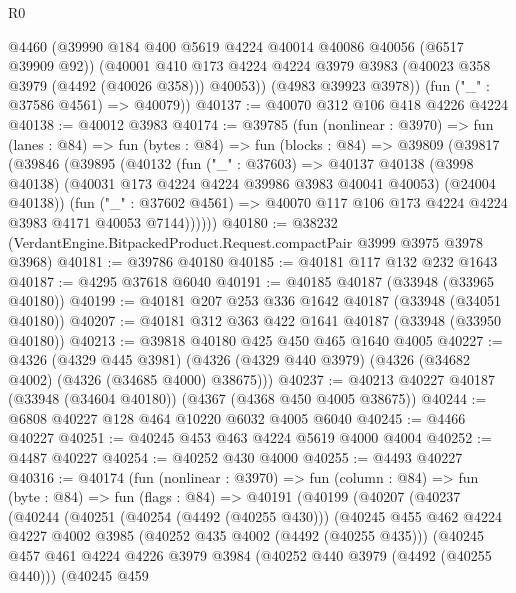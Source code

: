 \begin{lexlean}{R0}
\begin{coremodule}
          @4460
          (@39990 @184 @400 @5619 @4224 @40014 @40086 @40056 (@6517 @39909 @92))
          (@40001
            @410
            @173
            @4224
            @4224
            @3979
            @3983
            (@40023 @358 @3979 (@4492 (@40026 @358)))
            @40053))
        (@4983 @39923 @3978))
      (fun ("_" : @37586 @4561) => @40079))
@40137 := @40070 @312 @106 @418 @4226 @4224
@40138 := @40012 @3983
@40174 := @39785
    (fun (nonlinear : @3970) =>
    fun (lanes : @84) =>
    fun (bytes : @84) =>
    fun (blocks : @84) =>
    @39809
      (@39817
        (@39846
          (@39895
            (@40132
              (fun ("_" : @37603) =>
              @40137
                @40138
                (@3998 @40138)
                (@40031 @173 @4224 @4224 @39986 @3983 @40041 @40053)
                (@24004 @40138))
              (fun ("_" : @37602 @4561) =>
              @40070 @117 @106 @173 @4224 @4224 @3983 @4171 @40053 @7144))))))
@40180 := @38232 (VerdantEngine.BitpackedProduct.Request.compactPair @3999 @3975 @3978 @3968)
@40181 := @39786 @40180
@40185 := @40181 @117 @132 @232 @1643
@40187 := @4295 @37618 @6040
@40191 := @40185 @40187 (@33948 (@33965 @40180))
@40199 := @40181 @207 @253 @336 @1642 @40187 (@33948 (@34051 @40180))
@40207 := @40181 @312 @363 @422 @1641 @40187 (@33948 (@33950 @40180))
@40213 := @39818 @40180 @425 @450 @465 @1640 @4005
@40227 := @4326
    (@4329 @445 @3981)
    (@4326 (@4329 @440 @3979) (@4326 (@34682 @4002) (@4326 (@34685 @4000) @38675)))
@40237 := @40213 @40227 @40187 (@33948 (@34604 @40180)) (@4367 (@4368 @450 @4005 @38675))
@40244 := @6808 @40227 @128 @464 @10220 @6032 @4005 @6040
@40245 := @4466 @40227
@40251 := @40245 @453 @463 @4224 @5619 @4000 @4004
@40252 := @4487 @40227
@40254 := @40252 @430 @4000
@40255 := @4493 @40227
@40316 := @40174
    (fun (nonlinear : @3970) =>
    fun (column : @84) =>
    fun (byte : @84) =>
    fun (flags : @84) =>
    @40191
      (@40199
        (@40207
          (@40237
            (@40244
              (@40251
                (@40254 (@4492 (@40255 @430)))
                (@40245
                  @455
                  @462
                  @4224
                  @4227
                  @4002
                  @3985
                  (@40252 @435 @4002 (@4492 (@40255 @435)))
                  (@40245
                    @457
                    @461
                    @4224
                    @4226
                    @3979
                    @3984
                    (@40252 @440 @3979 (@4492 (@40255 @440)))
                    (@40245
                      @459

\end{coremodule}
\end{lexlean}
